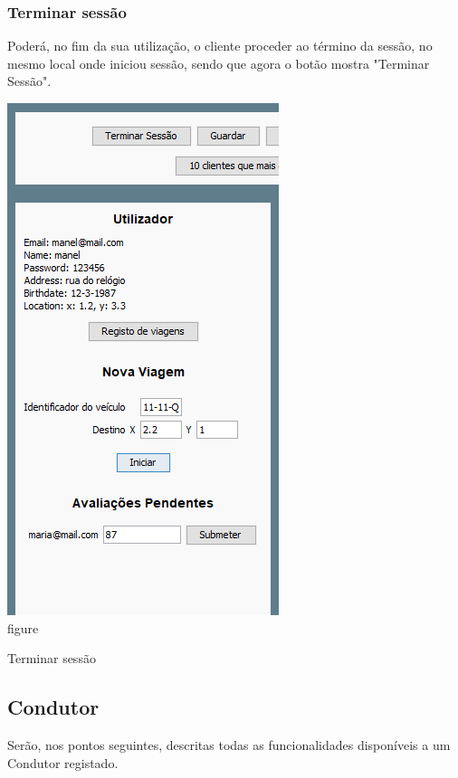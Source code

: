 \documentclass[a4paper]{article}
\begin{document}
\subsubsection{Terminar sessão}
Poderá, no fim da sua utilização, o cliente proceder ao término da sessão, no mesmo local onde iniciou sessão, sendo que agora o botão mostra "Terminar Sessão".
\begin{center}
  \includegraphics[scale=0.70]{terminarsessao}\\
  \caption{figure}{Terminar sessão}
  \label{fig:picture}
\end{center}

\subsection{Condutor}
Serão, nos pontos seguintes, descritas todas as funcionalidades disponíveis a um Condutor registado.
\end{document}
